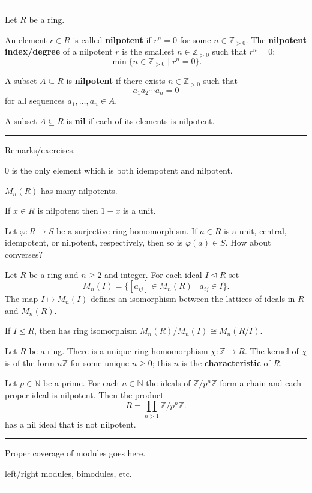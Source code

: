 \documentclass[12pt]{article}
\newcommand{\keyword}[1]{\textbf{#1}}
\newcommand{\sepline}{\rule{\textwidth}{0.4pt}}
\theoremstyle{definition}
\newcommand{\N}{\mathbb{N}}
\newcommand{\Z}{\mathbb{Z}}
\renewcommand{\phi}{\varphi}
\newcommand{\<}{\left\langle}
\renewcommand{\>}{\right\rangle}
\newcommand{\iso}{\cong}
\newcommand{\seq}{\subseteq}
\newcommand{\teq}{\trianglelefteq}
\renewcommand{\_}[1]{{_{#1}}}
\begin{document}
\sepline

Let $R$ be a ring.

An element $r \in R$ is called \keyword{nilpotent} if $r^n = 0$ for some $n \in \Z_{>0}$.
The \keyword{nilpotent index/degree} of a nilpotent $r$ is the smallest $n \in \Z_{>0}$ such that $r^n = 0$:
\[
    \min\{n \in \Z_{>0} \mid r^n = 0\}.
\]

A subset $A \seq R$ is \keyword{nilpotent} if there exists $n \in \Z_{>0}$ such that
\[
    a_1a_2 \cdots a_n = 0
\]
for all sequences $a_1, \dots, a_n \in A$.

A subset $A \seq R$ is \keyword{nil} if each of its elements is nilpotent.

\sepline

Remarks/exercises.

$0$ is the only element which is both idempotent and nilpotent.

$M_n(R)$ has many nilpotents.

If $x \in R$ is nilpotent then $1 - x$ is a unit.

Let $\phi : R \to S$ be a surjective ring homomorphism.
If $a \in R$ is a unit, central, idempotent, or nilpotent, respectively, then so is $\phi(a) \in S$.
How about converses?

Let $R$ be a ring and $n \geq 2$ and integer.
For each ideal $I \teq R$ set
\[
    M_n(I) = \{[a_{ij}] \in M_n(R) \mid a_{ij} \in I\}.
\]
The map $I \mapsto M_n(I)$ defines an isomorphism between the lattices of ideals in $R$ and $M_n(R)$.

If $I \teq R$, then has ring isomorphism $M_n(R)/M_n(I) \iso M_n(R/I)$.


Let $R$ be a ring.
There is a unique ring homomorphism $\chi : \Z \to R$.
The kernel of $\chi$ is of the form $n\Z$ for some unique $n \geq 0$; this $n$ is the \keyword{characteristic} of $R$.


Let $p \in \N$ be a prime.
For each $n \in \N$ the ideals of $\Z/p^n\Z$ form a chain and each proper ideal is nilpotent.
Then the product
\[
    R = \prod_{n > 1} \Z/p^n\Z.
\]
has a nil ideal that is not nilpotent.

\sepline

Proper coverage of modules goes here.

left/right modules, bimodules, etc.

\sepline
\end{document}
